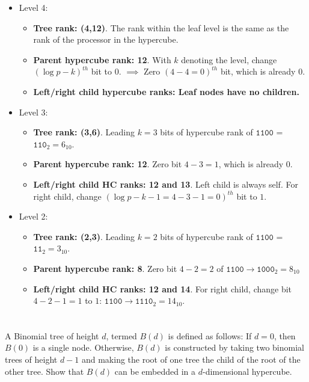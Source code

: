 \documentclass{article}
\begin{document}
\begin{enumerate}[label=(\alph*)]
  \begin{itemize}
    \item Level 4:
    \begin{itemize}
      \item \textbf{Tree rank: (4,12)}.
      The rank within the leaf level is the same as the rank of the processor in the hypercube.
      \item \textbf{Parent hypercube rank: 12}.
      With $k$ denoting the level, change $\left(\log{p} - k\right)^{th}$ bit to $0$.
      $\implies$ Zero $\left(4 - 4 = 0\right)^{th}$ bit, which is already $0$.
      \item \textbf{Left/right child hypercube ranks: Leaf nodes have no children.}
    \end{itemize}
    \item Level 3:
    \begin{itemize}
      \item \textbf{Tree rank: (3,6)}.
      Leading $k = 3$ bits of hypercube rank of $\texttt{1100}$ = $\texttt{110}_2 = 6_{10}$.
      \item \textbf{Parent hypercube rank: 12}.
      Zero bit $4 - 3 = 1$, which is already $0$.
      \item \textbf{Left/right child HC ranks: 12 and 13}.
      Left child is always self.
      For right child, change $\left(\log{p} - k - 1 = 4 - 3 - 1 = 0\right)^{th}$ bit to $1$. 
    \end{itemize}
    \item Level 2:
    \begin{itemize}
      \item \textbf{Tree rank: (2,3)}.
      Leading $k = 2$ bits of hypercube rank of $\texttt{1100}$ = $\texttt{11}_2 = 3_{10}$.
      \item \textbf{Parent hypercube rank: 8}.
      Zero bit $4 - 2 = 2$ of $\texttt{1100} \to \texttt{1000}_2 = 8_{10}$
      \item \textbf{Left/right child HC ranks: 12 and 14}.
      For right child, change bit $4 - 2 - 1 = 1$ to $1$: $\texttt{1100} \to \texttt{1110}_2 = 14_{10}$. 
    \end{itemize}
  \end{itemize}

\end{enumerate}

\section{}
A Binomial tree of height $d$, termed $B(d)$ is defined as follows:
If $d = 0$, then $B(0)$ is a single node.
Otherwise, $B(d)$ is constructed by taking two binomial trees of height $d - 1$ and making the root of one tree the child of the root of the other tree.
Show that $B(d)$ can be embedded in a $d$-dimensional hypercube.
\end{document}
